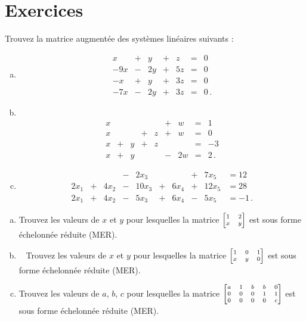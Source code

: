 \section*{Exercices}




\begin{prob} \label{prob11.1} Trouvez la matrice augmentée des systèmes linéaires suivants :
\medskip
\begin{enumerate}[a)]
\item 
$$\begin{matrix}
x&+&y&+&z&=&0\\
-9x&-&2y&+&5z&=&0\\
-x&+&y&+&3z&=&0\\
-7x&-&2y&+&3z&=&0\,. \end{matrix} $$
\medskip
 

\item\sov~$$\begin{matrix} x&&&&&+&w&=&1\\
x&&&+&z&+&w&=&0\\
x&+&y&+&z&&&=&-3\\
x&+&y&&&-&2w&=&2\,. \end{matrix}$$
\medskip
  
\item 
$$\begin{matrix} &&&-&2x_{3}&&&+&7x_{5}&=12\\
2x_{1}&+&4x_{2}&-&10x_{3}&+&6x_{4}&+&12x_{5}&=28\\
2x_{1}&+&4x_{2}&-&5x_{3}&+&6x_{4}&-&5x_{5}&=-1\,.\end{matrix}$$
\medskip
 
\end{enumerate}
\end{prob} \begin{prob} \label{prob11.2}
\medskip
\begin{enumerate}[a)]
\item Trouvez les valeurs de $x$ et $y$ pour lesquelles la matrice $\scriptsize\bmatrix 1&2\cr
x&y \endbmatrix$ est sous forme échelonn\'ee réduite (MER).
\medskip
 
\item\sov~ Trouvez  les valeurs de $x$ et $y$ pour lesquelles la matrice $\scriptsize\bmatrix 1&0&1\cr
x&y&0\endbmatrix$ est sous forme échelonnée réduite (MER).
\medskip
 
\item  Trouvez  les valeurs de $a$, $b$, $c$ pour lesquelles la matrice
$\scriptsize\bmatrix a&1&b&b&0\cr 0&0&0&1&1\cr 0&0&0&0&c\endbmatrix$ est sous
forme échelonnée réduite (MER).
\medskip
 
\end{enumerate}

\end{prob}